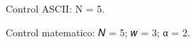 \documentclass{article}
\begin{document}
Control ASCII: N = 5.

Control matematico: 𝑁 = 5; 𝑤 = 3; α = 2.
\end{document}
